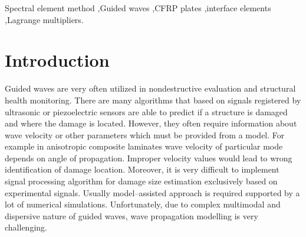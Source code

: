 \documentclass[preprint,12pt]{elsarticle}
\begin{document}
\begin{frontmatter}
		\begin{keyword}
			Spectral element method \sep Guided waves \sep CFRP plates \sep interface elements \sep Lagrange multipliers.
			
			
		\end{keyword}
		
	\end{frontmatter}
	
	
	\section{Introduction}
	Guided waves are very often utilized in nondestructive evaluation and structural health monitoring. There are many algorithms that based on signals registered by ultrasonic or piezoelectric sensors are able to predict if a structure is damaged and where the damage is located. However, they often require information about wave velocity or other parameters which must be provided from a model. For example in anisotropic composite laminates wave velocity of particular mode depends on angle of propagation. Improper velocity values would lead to wrong identification of damage location.  Moreover, it is very difficult to implement signal processing algorithm for damage size estimation exclusively based on experimental signals. Usually model--assisted approach is required supported by a lot of numerical simulations. Unfortunately, due to complex multimodal and dispersive nature of guided waves, wave propagation modelling is very challenging. 
	
\end{document}
